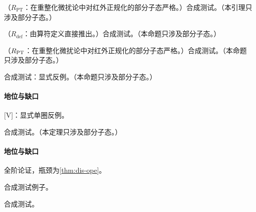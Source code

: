 \begin{lemma}\label{lem:dis-forward}
（$R_{\mathrm{PT}}$：在重整化微扰论中对红外正规化的部分子态严格。）合成测试。（本引理只涉及部分子态。）
\end{lemma}

\begin{proposition}\label{prop:dis-rdef}
（$R_{\mathrm{def}}$：由算符定义直接推出。）合成测试。（本命题只涉及部分子态。）
\end{proposition}

\begin{proposition}\label{prop:dis-notverbatim}
（$R_{\rm PT}$：在重整化微扰论中对红外正规化的部分子态严格。）合成测试。（本命题只涉及部分子态。）
\end{proposition}

\begin{proposition}\label{prop:dis-violated}
合成测试：显式反例。（本命题只涉及部分子态。）
\end{proposition}

\paragraph{地位与缺口}[V]：显式单圈反例\cite{Collins2011}。

\begin{theorem}\label{thm:dis-usesv}
合成测试。（本定理只涉及部分子态。）
\end{theorem}

\paragraph{地位与缺口}全阶论证，瓶颈为\cref{thm:dis-ope}。

\begin{example}[例子]\label{ex:dis-example}
合成测试例子。
\end{example}

\begin{remark}\label{rem:dis-tagged}
合成测试。
\end{remark}

